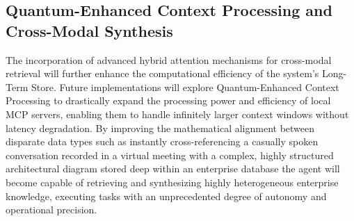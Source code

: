 \documentclass[12pt, a4paper]{report}
\begin{document}
\subsection{Quantum-Enhanced Context Processing and Cross-Modal Synthesis}
The incorporation of advanced hybrid attention mechanisms for cross-modal retrieval will further enhance the computational efficiency of the system's Long-Term Store.\cite{hojo2025} Future implementations will explore Quantum-Enhanced Context Processing to drastically expand the processing power and efficiency of local MCP servers, enabling them to handle infinitely larger context windows without latency degradation.\cite{superagi2026} By improving the mathematical alignment between disparate data types such as instantly cross-referencing a casually spoken conversation recorded in a virtual meeting with a complex, highly structured architectural diagram stored deep within an enterprise database the agent will become capable of retrieving and synthesizing highly heterogeneous enterprise knowledge, executing tasks with an unprecedented degree of autonomy and operational precision.
\end{document}
